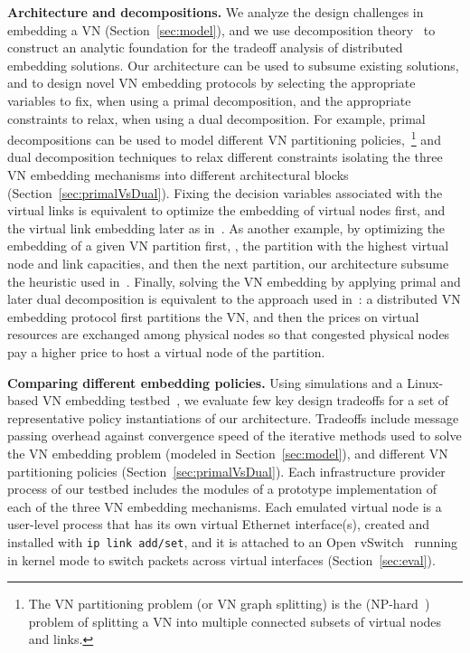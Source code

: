 \documentclass[a4paper, 10pt, conference]{ieeeconf}
\begin{document}
\noindent
{\bf Architecture and decompositions.}  We analyze the design challenges in embedding a  VN (Section~\ref{sec:model}), and we use decomposition theory~\cite{boyd-book} to construct an analytic foundation for the tradeoff analysis of distributed embedding solutions. 
Our architecture can be used to subsume existing solutions, and to design novel VN embedding protocols by selecting the appropriate variables to fix, when using a primal decomposition, and the appropriate constraints to relax, when using a dual decomposition. 
 For example, primal decompositions can be used to model different VN partitioning policies,~\footnote{The VN partitioning problem (or VN graph splitting) is the (NP-hard~\cite{Houidi2011}) problem of splitting a VN into multiple connected subsets of virtual nodes and links.} and  dual decomposition techniques to relax different constraints isolating the three VN embedding mechanisms into different architectural blocks (Section~\ref{sec:primalVsDual}). Fixing the decision variables associated with the virtual links is equivalent to optimize the embedding of virtual nodes first, and the virtual link embedding later as in~\cite{pathsplitting}.
As another example, by optimizing the embedding of a given VN partition first, , the partition with the highest virtual node and link capacities, and then the next partition, our architecture subsume the heuristic used in~\cite{Houidi-distributedVNM}. 
Finally, solving the VN embedding by applying primal and later dual decomposition is equivalent to the approach used in~\cite{CAD}: a distributed VN embedding protocol first partitions the VN, and then the prices on virtual resources are exchanged among physical nodes so that congested physical nodes pay a higher price to host a virtual node of the partition.


\noindent
 {\bf Comparing different embedding policies.} Using simulations and a Linux-based VN embedding testbed~\cite{myPhDThesisTR}, we evaluate few key design tradeoffs for a set of representative policy instantiations of our architecture.
Tradeoffs include message passing overhead against convergence speed of the iterative methods used to solve the VN embedding problem (modeled in Section~\ref{sec:model}), and different VN partitioning policies  (Section~\ref{sec:primalVsDual}). 
Each infrastructure provider process of our testbed includes the modules of a prototype implementation of each of the three VN embedding mechanisms.
Each emulated virtual node is a user-level process that has its own virtual Ethernet interface(s), created and installed with {\tt ip link add/set}, and it is attached to an Open vSwitch~\cite{openvswitch} running in kernel mode to switch packets across virtual interfaces (Section~\ref{sec:eval}). 
\end{document}
